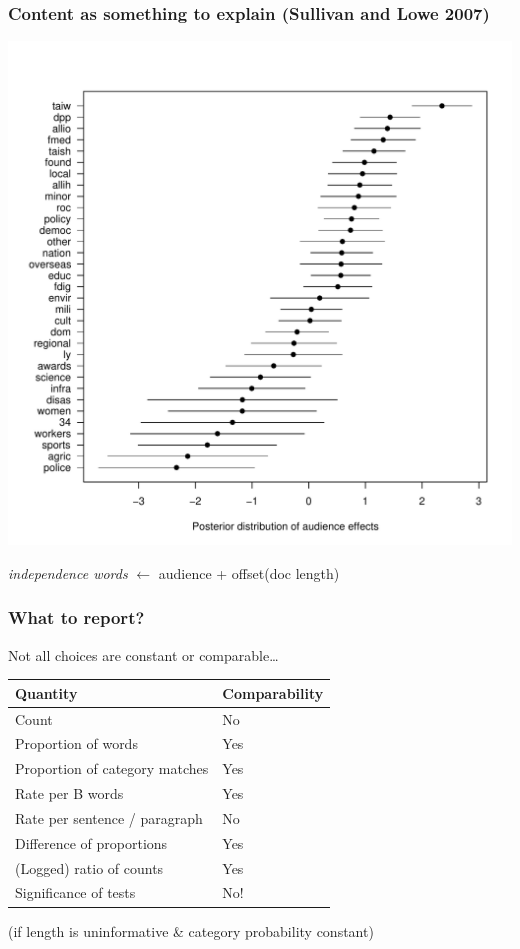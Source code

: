 \documentclass[11pt,compress,professionalfonts]{beamer}
\begin{document}
\begin{frame}[t]\frametitle{Content as something to explain (Sullivan and Lowe 2007)}

\centerline{\includegraphics[scale=.5]{pictures/indep-ref}}

\textsl{independence words} $\leftarrow$ audience + offset(doc length)

\end{frame}
\begin{frame}[t]\frametitle{What to report?}

Not all choices are constant or comparable\ldots

{\small
\begin{center}
\begin{tabular}{ll} \toprule
Quantity & Comparability\\ \midrule
Count & No \\
Proportion of words & Yes\\
Proportion of category matches & Yes\\
Rate per B words & Yes\\
Rate per sentence / paragraph & No\\
Difference of proportions & Yes\\
(Logged) ratio of counts & Yes\\
Significance of tests & No!\\
\bottomrule
\end{tabular}
\end{center}
\normalsize}

(if length is uninformative \& category probability constant)


\end{frame}
\end{document}
